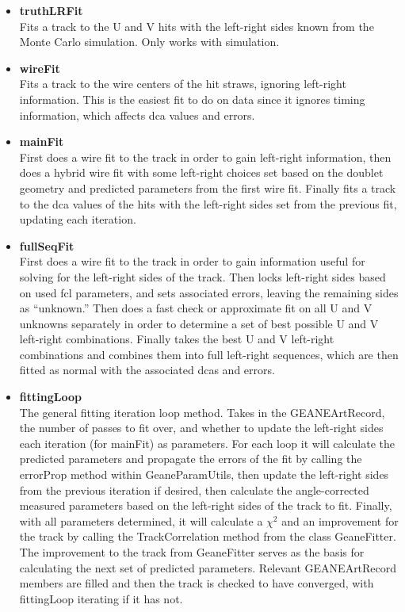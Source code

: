 \documentclass{article}
\begin{document}
\begin{enumerate}
        \begin{itemize}

          \item{\bf{truthLRFit}} \\
          Fits a track to the U and V hits with the left-right sides known from the Monte Carlo simulation. Only works with simulation.

          \item{\bf{wireFit}} \\
          Fits a track to the wire centers of the hit straws, ignoring left-right information. This is the easiest fit to do on data since it ignores timing information, which affects dca values and errors.

          \item{\bf{mainFit}} \\
          First does a wire fit to the track in order to gain left-right information, then does a hybrid wire fit with some left-right choices set based on the doublet geometry and predicted parameters from the first wire fit. Finally fits a track to the dca values of the hits with the left-right sides set from the previous fit, updating each iteration.

          \item{\bf{fullSeqFit}} \\
          First does a wire fit to the track in order to gain information useful for solving for the left-right sides of the track. Then locks left-right sides based on used fcl parameters, and sets associated errors, leaving the remaining sides as ``unknown.'' Then does a fast check or approximate fit on all U and V unknowns separately in order to determine a set of best possible U and V left-right combinations. Finally takes the best U and V left-right combinations and combines them into full left-right sequences, which are then fitted as normal with the associated dcas and errors.

          \item{\bf{fittingLoop}} \\ 
          The general fitting iteration loop method. Takes in the GEANEArtRecord, the number of passes to fit over, and whether to update the left-right sides each iteration (for mainFit) as parameters. For each loop it will calculate the predicted parameters and propagate the errors of the fit by calling the errorProp method within GeaneParamUtils, then update the left-right sides from the previous iteration if desired, then calculate the angle-corrected measured parameters based on the left-right sides of the track to fit. Finally, with all parameters determined, it will calculate a $\chi^{2}$ and an improvement for the track by calling the TrackCorrelation method from the class GeaneFitter. The improvement to the track from GeaneFitter serves as the basis for calculating the next set of predicted parameters. Relevant GEANEArtRecord members are filled and then the track is checked to have converged, with fittingLoop iterating if it has not. 


\end{itemize}
\end{enumerate}
\end{document}
